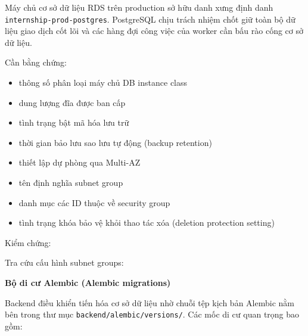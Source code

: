 Máy chủ cơ sở dữ liệu RDS trên production sở hữu danh xưng định danh
\texttt{internship-\allowbreak{}prod-\allowbreak{}postgres}. PostgreSQL chịu trách nhiệm chốt giữ
toàn bộ dữ liệu giao dịch cốt lõi và các hàng đợi công việc của worker
cần bấu rào cống cơ sở dữ liệu.

Cần bằng chứng:

\begin{itemize}
\tightlist
\item
  thông số phân loại máy chủ DB instance class
\item
  dung lượng đĩa được ban cấp
\item
  tình trạng bật mã hóa lưu trữ
\item
  thời gian bảo lưu sao lưu tự động (backup retention)
\item
  thiết lập dự phòng qua Multi-AZ
\item
  tên định nghĩa subnet group
\item
  danh mục các ID thuộc về security group
\item
  tình trạng khóa bảo vệ khỏi thao tác xóa (deletion protection setting)
\end{itemize}

Kiểm chứng:

\begin{Shaded}
\begin{Highlighting}[]
\DataTypeTok{\textbackslash{}}
  \DataTypeTok{\textbackslash{}}
\end{Highlighting}
\end{Shaded}

Tra cứu cấu hình subnet groups:

\begin{Shaded}
\begin{Highlighting}[]
\end{Highlighting}
\end{Shaded}

\vspace{0.5em}\noindent\textbf{Bộ di cư Alembic (Alembic
migrations)}\par

Backend điều khiển tiến hóa cơ sở dữ liệu nhờ chuỗi tệp kịch bản Alembic
nằm bên trong thư mục \texttt{backend/\allowbreak{}alembic/\allowbreak{}versions/\allowbreak{}}. Các mốc di cư
quan trọng bao gồm:

